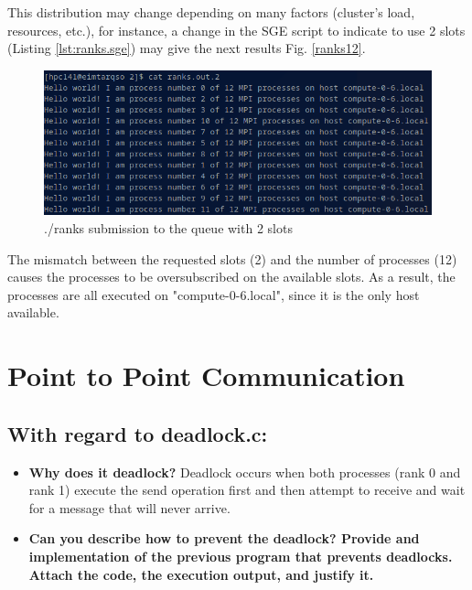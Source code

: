 \documentclass[11pt]{article}
\begin{document}
This distribution may change depending on many factors (cluster's load, resources, etc.), for instance, a change in the SGE script to indicate to use 2 slots (Listing \ref{lst:ranks.sge}) may give the next results Fig. \ref{ranks12}.



\begin{figure}[h!]
    \centering
    \includegraphics{ranks.png}
    \caption*{./ranks submission to the queue with 2 slots}
    \label{fig:2.2}
\end{figure}

The mismatch between the requested slots (2) and the number of processes (12) causes the processes to be oversubscribed on the available slots. As a result, the processes are all executed on "compute-0-6.local", since it is the only host available.

\hypertarget{3}{%
\section{Point to Point Communication}\label{3}}

\subsection*{With regard to deadlock.c:}

\begin{itemize}
  \item \textbf{Why does it deadlock?}
    Deadlock occurs when both processes (rank 0 and rank 1) execute the send operation first and then attempt to receive and wait for a message that will never arrive.
  \item \textbf{Can you describe how to prevent the deadlock? Provide and implementation of the previous program that prevents deadlocks. Attach the code, the execution output, and justify it.}
\end{itemize}
\end{document}

